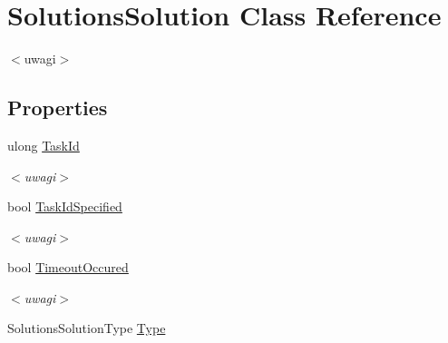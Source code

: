 \hypertarget{class_solutions_solution}{}\section{Solutions\+Solution Class Reference}
\label{class_solutions_solution}


$<$uwagi$>$  


\subsection*{Properties}
\begin{DoxyCompactItemize}
\item 
\hypertarget{class_solutions_solution_a146ffdc6d4b78c7a5505e3f1a6f2ebf6}{}ulong \hyperlink{class_solutions_solution_a146ffdc6d4b78c7a5505e3f1a6f2ebf6}{Task\+Id}\label{class_solutions_solution_a146ffdc6d4b78c7a5505e3f1a6f2ebf6}

\begin{DoxyCompactList}\small\item\em $<$uwagi$>$ \end{DoxyCompactList}\item 
\hypertarget{class_solutions_solution_a0da9403e39ce1ccb6894ef5783182742}{}bool \hyperlink{class_solutions_solution_a0da9403e39ce1ccb6894ef5783182742}{Task\+Id\+Specified}\label{class_solutions_solution_a0da9403e39ce1ccb6894ef5783182742}

\begin{DoxyCompactList}\small\item\em $<$uwagi$>$ \end{DoxyCompactList}\item 
\hypertarget{class_solutions_solution_a3731068ae27245c8cc0d994d43ed645c}{}bool \hyperlink{class_solutions_solution_a3731068ae27245c8cc0d994d43ed645c}{Timeout\+Occured}\label{class_solutions_solution_a3731068ae27245c8cc0d994d43ed645c}

\begin{DoxyCompactList}\small\item\em $<$uwagi$>$ \end{DoxyCompactList}\item 
\hypertarget{class_solutions_solution_a7b9c97daf6483acd817206b1f7a86b7b}{}Solutions\+Solution\+Type \hyperlink{class_solutions_solution_a7b9c97daf6483acd817206b1f7a86b7b}{Type}\label{class_solutions_solution_a7b9c97daf6483acd817206b1f7a86b7b}


\end{DoxyCompactItemize}
